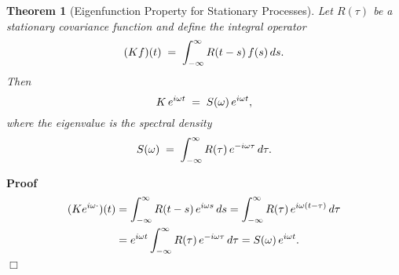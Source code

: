 \documentclass{article}
\newenvironment{proof}{\noindent\textbf{Proof\ }}{\hspace*{\fill}$\Box$\medskip}
\newtheorem{theorem}{Theorem}
\begin{document}
\begin{theorem}[Eigenfunction Property for Stationary Processes]
  Let $R (\tau)$ be a stationary covariance function and define the integral
  operator
  \begin{equation}
    (Kf) (t) \hspace{0.27em} = \hspace{0.27em} \int_{- \infty}^{\infty} R (t -
    s)  \hspace{0.17em} f (s)  \hspace{0.17em} ds.
  \end{equation}
  Then
  \begin{equation}
    K \hspace{0.17em} e^{i \omega t} \hspace{0.27em} = \hspace{0.27em} S
    (\omega)  \hspace{0.17em} e^{i \omega t},
  \end{equation}
  where the eigenvalue is the spectral density
  \begin{equation}
    S (\omega) \hspace{0.27em} = \hspace{0.27em} \int_{- \infty}^{\infty} R
    (\tau)  \hspace{0.17em} e^{- i \omega \tau}  \hspace{0.17em} d \tau .
  \end{equation}
\end{theorem}

\begin{proof}
  \begin{align*}
    (Ke^{i \omega \cdot}) (t) & = \int_{- \infty}^{\infty} R (t - s) 
    \hspace{0.17em} e^{i \omega s}  \hspace{0.17em} ds = \int_{-
    \infty}^{\infty} R (\tau)  \hspace{0.17em} e^{i \omega (t - \tau)} 
    \hspace{0.17em} d \tau\\
    & = e^{i \omega t}  \int_{- \infty}^{\infty} R (\tau)  \hspace{0.17em}
    e^{- i \omega \tau}  \hspace{0.17em} d \tau = S (\omega)  \hspace{0.17em}
    e^{i \omega t} .
  \end{align*}
\end{proof}
\end{document}
